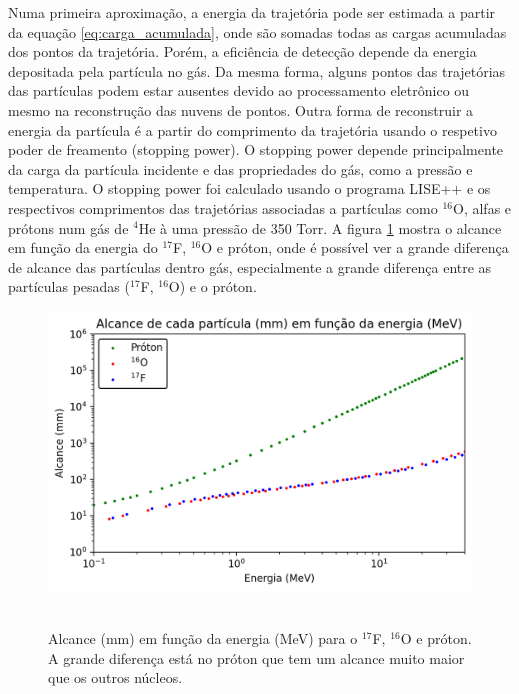 \documentclass[a4paper,12pt,oneside]{book}
\begin{document}
\par Numa primeira aproximação, a energia da trajetória pode ser estimada a partir da equação \ref{eq:carga_acumulada}, onde são somadas todas as cargas acumuladas dos pontos da trajetória. Porém, a eficiência de detecção depende da energia depositada pela partícula no gás. Da mesma forma, alguns pontos das trajetórias das partículas podem estar ausentes devido ao processamento eletrônico ou mesmo na reconstrução das nuvens de pontos. Outra forma de reconstruir a energia da partícula é a partir do comprimento da trajetória usando o respetivo poder de freamento (stopping power). O stopping power depende principalmente da carga da partícula incidente e das propriedades do gás, como a pressão e temperatura. O stopping power foi calculado usando o programa LISE++\cite{lise++} e os respectivos comprimentos das trajetórias associadas a partículas como $^{16}$O, alfas e prótons num gás de $^4$He à uma pressão de 350 Torr. A figura \ref{fig:alcance_vs_energia} mostra o alcance em função da energia do $^{17}$F, $^{16}$O e próton, onde é possível ver a grande diferença de alcance das partículas dentro gás, especialmente a grande diferença entre as partículas pesadas ($^{17}$F, $^{16}$O) e o próton.


 \begin{figure}[H]
     \centering
     \includegraphics[scale = 0.85]{figs/alcance_vs_energia_2.png}\
     \caption{Alcance (mm) em função da energia (MeV) para o $^{17}$F, $^{16}$O e próton. A grande diferença está no próton que tem um alcance muito maior que os outros núcleos.}
     \label{fig:alcance_vs_energia}
 \end{figure}
\end{document}
